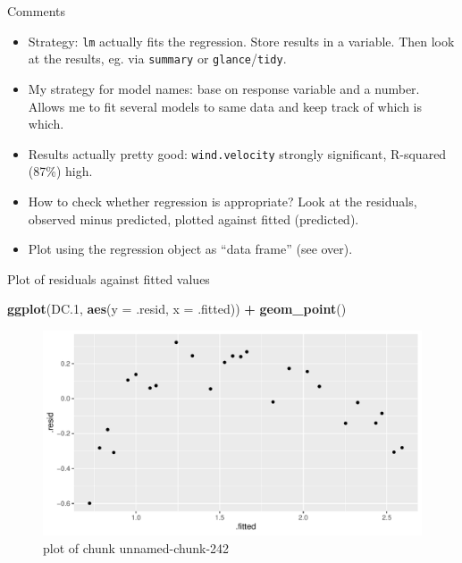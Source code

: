\documentclass[ignorenonframetext,]{beamer}
\newenvironment{Shaded}{\begin{snugshade}}{\end{snugshade}}
\newcommand{\DataTypeTok}[1]{\textcolor[rgb]{0.13,0.29,0.53}{#1}}
\newcommand{\FloatTok}[1]{\textcolor[rgb]{0.00,0.00,0.81}{#1}}
\newcommand{\KeywordTok}[1]{\textcolor[rgb]{0.13,0.29,0.53}{\textbf{#1}}}
\newcommand{\NormalTok}[1]{#1}
\newcommand{\OperatorTok}[1]{\textcolor[rgb]{0.81,0.36,0.00}{\textbf{#1}}}
\newcommand{\StringTok}[1]{\textcolor[rgb]{0.31,0.60,0.02}{#1}}
\providecommand{\tightlist}{%
  \setlength{\itemsep}{0pt}\setlength{\parskip}{0pt}}
\begin{document}
\begin{frame}[fragile]{Comments}
\protect\hypertarget{comments-14}{}

\begin{itemize}
\tightlist
\item
  Strategy: \texttt{lm} actually fits the regression. Store results in a
  variable. Then look at the results, eg. via \texttt{summary} or
  \texttt{glance}/\texttt{tidy}.
\item
  My strategy for model names: base on response variable and a number.
  Allows me to fit several models to same data and keep track of which
  is which.
\item
  Results actually pretty good: \texttt{wind.velocity} strongly
  significant, R-squared (87\%) high.
\item
  How to check whether regression is appropriate? Look at the residuals,
  observed minus predicted, plotted against fitted (predicted).
\item
  Plot using the regression object as ``data frame'' (see over).
\end{itemize}

\end{frame}

\begin{frame}[fragile]{Plot of residuals against fitted values}
\protect\hypertarget{plot-of-residuals-against-fitted-values}{}

\begin{Shaded}
\begin{Highlighting}[]
\KeywordTok{ggplot}\NormalTok{(DC}\FloatTok{.1}\NormalTok{, }\KeywordTok{aes}\NormalTok{(}\DataTypeTok{y =}\NormalTok{ .resid, }\DataTypeTok{x =}\NormalTok{ .fitted)) }\OperatorTok{+}\StringTok{ }\KeywordTok{geom_point}\NormalTok{()}
\end{Highlighting}
\end{Shaded}

\begin{figure}
\centering
\includegraphics{figure/unnamed-chunk-242-1.pdf}
\caption{plot of chunk unnamed-chunk-242}
\end{figure}

\end{frame}
\end{document}

